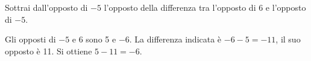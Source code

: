 
\begin{esercizio}
Sottrai dall'opposto di $-5$ l'opposto della differenza tra l'opposto di 6 e l'opposto di $-5$.
\end{esercizio}

\begin{soluzione}
Gli opposti di $-5$ e 6 sono 5 e $-6$. La differenza indicata è $-6-5=-11$, il suo opposto è 11. Si ottiene $5-11=-6$.
\end{soluzione}
